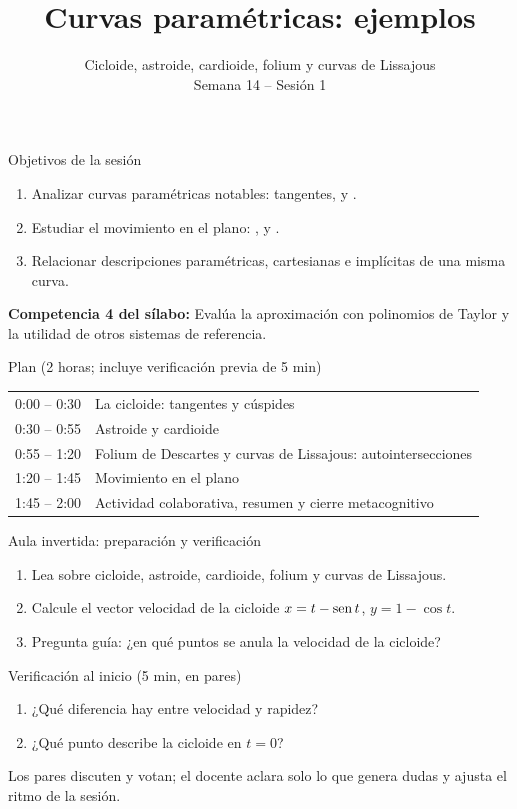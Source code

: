 \documentclass[10pt,aspectratio=169]{beamer}
\title[Paramétricas: ejemplos]{Curvas paramétricas: ejemplos}
\subtitle{Cicloide, astroide, cardioide, folium y curvas de Lissajous\\[2pt]\small Semana 14 -- Sesión 1}
\begin{document}
\begin{frame}
  \titlepage
\end{frame}

\begin{frame}{Objetivos de la sesión}
  \begin{enumerate}
    \item Analizar curvas paramétricas notables: tangentes,  y .
    \item Estudiar el movimiento en el plano: ,  y .
    \item Relacionar descripciones paramétricas, cartesianas e implícitas de una misma curva.
  \end{enumerate}
  \vspace{1mm}
  {\small\textbf{Competencia 4 del sílabo:} Evalúa la aproximación con polinomios de Taylor y la utilidad de otros sistemas de referencia.}
  \begin{block}{Plan (2 horas; incluye verificación previa de 5 min)}
    \begin{tabular}{ll}
      0:00 -- 0:30 & La cicloide: tangentes y cúspides\\
      0:30 -- 0:55 & Astroide y cardioide\\
      0:55 -- 1:20 & Folium de Descartes y curvas de Lissajous: autointersecciones\\
      1:20 -- 1:45 & Movimiento en el plano\\
      1:45 -- 2:00 & Actividad colaborativa, resumen y cierre metacognitivo
    \end{tabular}
  \end{block}
\end{frame}

\begin{frame}{Aula invertida: preparación y verificación}
  \small
  \begin{previa}
    \begin{enumerate}
      \item Lea sobre cicloide, astroide, cardioide, folium y curvas de Lissajous.
      \item Calcule el vector velocidad de la cicloide $x=t-\operatorname{sen} t$, $y=1-\cos t$.
      \item Pregunta guía: ¿en qué puntos se anula la velocidad de la cicloide?
    \end{enumerate}
  \end{previa}
  \begin{block}{Verificación al inicio (5 min, en pares)}
    \begin{enumerate}
      \item ¿Qué diferencia hay entre velocidad y rapidez?
      \item ¿Qué punto describe la cicloide en $t=0$?
    \end{enumerate}
    Los pares discuten y votan; el docente aclara solo lo que genera dudas y ajusta el ritmo de la sesión.
  \end{block}
\end{frame}
\end{document}
